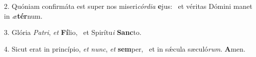 2. Quóniam confirmáta est super nos miseri\textit{cór}\textit{di}\textit{a} \textbf{e}jus: \ast\  et véritas Dómini manet in \textit{æ}\textbf{tér}num.\

3. Glória \textit{Pa}\textit{tri}, \textit{et} \textbf{Fí}lio, \ast\  et Spirítu\textit{i} \textbf{Sanc}to.\

4. Sicut erat in princípio, \textit{et} \textit{nunc}, \textit{et} \textbf{sem}per, \ast\  et in sǽcula sæculó\textit{rum}. \textbf{A}men.\

